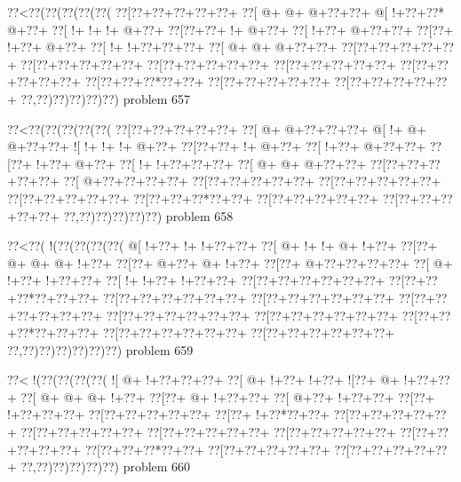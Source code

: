 \vbox{\vbox{\goo
\0??<\0??(\0??(\0??(\0??(\0??(
\0??[\0??+\0??+\0??+\0??+\0??+
\0??[\- @+\- @+\- @+\0??+\0??+
\- @[\- !+\0??+\0??*\- @+\0??+
\0??[\- !+\- !+\- !+\- @+\0??+
\0??[\0??+\0??+\- !+\- @+\0??+
\0??[\- !+\0??+\- @+\0??+\0??+
\0??[\0??+\- !+\0??+\- @+\0??+
\0??[\- !+\- !+\0??+\0??+\0??+
\0??[\- @+\- @+\- @+\0??+\0??+
\0??[\0??+\0??+\0??+\0??+\0??+
\0??[\0??+\0??+\0??+\0??+\0??+
\0??[\0??+\0??+\0??+\0??+\0??+
\0??[\0??+\0??+\0??+\0??+\0??+
\0??[\0??+\0??+\0??+\0??+\0??+
\0??[\0??+\0??+\0??*\0??+\0??+
\0??[\0??+\0??+\0??+\0??+\0??+
\0??[\0??+\0??+\0??+\0??+\0??+
\0??,\0??)\0??)\0??)\0??)\0??)
}
\hfil problem 657\hfil\break
}

\vbox{\vbox{\goo
\0??<\0??(\0??(\0??(\0??(\0??(
\0??[\0??+\0??+\0??+\0??+\0??+
\0??[\- @+\- @+\0??+\0??+\0??+
\- @[\- !+\- @+\- @+\0??+\0??+
\- ![\- !+\- !+\- !+\- @+\0??+
\0??[\0??+\0??+\- !+\- @+\0??+
\0??[\- !+\0??+\- @+\0??+\0??+
\0??[\0??+\- !+\0??+\- @+\0??+
\0??[\- !+\- !+\0??+\0??+\0??+
\0??[\- @+\- @+\- @+\0??+\0??+
\0??[\0??+\0??+\0??+\0??+\0??+
\0??[\- @+\0??+\0??+\0??+\0??+
\0??[\0??+\0??+\0??+\0??+\0??+
\0??[\0??+\0??+\0??+\0??+\0??+
\0??[\0??+\0??+\0??+\0??+\0??+
\0??[\0??+\0??+\0??*\0??+\0??+
\0??[\0??+\0??+\0??+\0??+\0??+
\0??[\0??+\0??+\0??+\0??+\0??+
\0??,\0??)\0??)\0??)\0??)\0??)
}
\hfil problem 658\hfil\break
}

\vbox{\vbox{\goo
\0??<\0??(\- !(\0??(\0??(\0??(\0??(
\- @[\- !+\0??+\- !+\- !+\0??+\0??+
\0??[\- @+\- !+\- !+\- @+\- !+\0??+
\0??[\0??+\- @+\- @+\- @+\- !+\0??+
\0??[\0??+\- @+\0??+\- @+\- !+\0??+
\0??[\0??+\- @+\0??+\0??+\0??+\0??+
\0??[\- @+\- !+\0??+\- !+\0??+\0??+
\0??[\- !+\- !+\0??+\- !+\0??+\0??+
\0??[\0??+\0??+\0??+\0??+\0??+\0??+
\0??[\0??+\0??+\0??*\0??+\0??+\0??+
\0??[\0??+\0??+\0??+\0??+\0??+\0??+
\0??[\0??+\0??+\0??+\0??+\0??+\0??+
\0??[\0??+\0??+\0??+\0??+\0??+\0??+
\0??[\0??+\0??+\0??+\0??+\0??+\0??+
\0??[\0??+\0??+\0??+\0??+\0??+\0??+
\0??[\0??+\0??+\0??*\0??+\0??+\0??+
\0??[\0??+\0??+\0??+\0??+\0??+\0??+
\0??[\0??+\0??+\0??+\0??+\0??+\0??+
\0??,\0??)\0??)\0??)\0??)\0??)\0??)
}
\hfil problem 659\hfil\break
}

\vbox{\vbox{\goo
\0??<\- !(\0??(\0??(\0??(\0??(
\- ![\- @+\- !+\0??+\0??+\0??+
\0??[\- @+\- !+\0??+\- !+\0??+
\- ![\0??+\- @+\- !+\0??+\0??+
\0??[\- @+\- @+\- @+\- !+\0??+
\0??[\0??+\- @+\- !+\0??+\0??+
\0??[\- @+\0??+\- !+\0??+\0??+
\0??[\0??+\- !+\0??+\0??+\0??+
\0??[\0??+\0??+\0??+\0??+\0??+
\0??[\0??+\- !+\0??*\0??+\0??+
\0??[\0??+\0??+\0??+\0??+\0??+
\0??[\0??+\0??+\0??+\0??+\0??+
\0??[\0??+\0??+\0??+\0??+\0??+
\0??[\0??+\0??+\0??+\0??+\0??+
\0??[\0??+\0??+\0??+\0??+\0??+
\0??[\0??+\0??+\0??*\0??+\0??+
\0??[\0??+\0??+\0??+\0??+\0??+
\0??[\0??+\0??+\0??+\0??+\0??+
\0??,\0??)\0??)\0??)\0??)\0??)
}
\hfil problem 660\hfil\break
}

